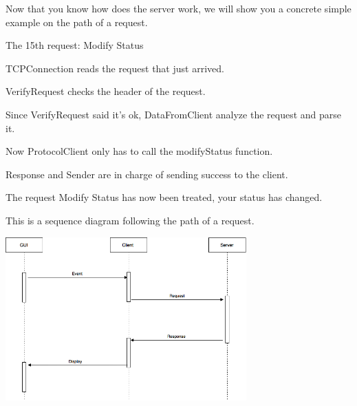 \documentclass{article}
\begin{document}
  Now that you know how does the server work, we will show you a concrete simple example on the path of a request.

  \bigskip
  The 15th request: Modify Status

  \bigskip
  TCPConnection reads the request that just arrived.

  \bigskip
  VerifyRequest checks the header of the request.

  \bigskip
  Since VerifyRequest said it's ok, DataFromClient analyze the request and parse it.

  \bigskip
  Now ProtocolClient only has to call the modifyStatus function.

  \bigskip
  Response and Sender are in charge of sending success to the client.

  \bigskip
  The request Modify Status has now been treated, your status has changed.

  \bigskip
  This is a sequence diagram following the path of a request.

  \bigskip
  \includegraphics[width=350]{Sequence}
\end{document}
